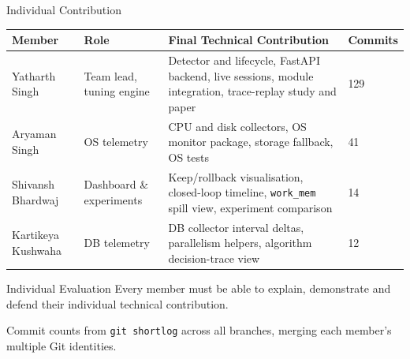 \documentclass[aspectratio=169,11pt]{beamer}
\newcommand{\smallnote}[1]{%
\vspace{0.08cm}
{\scriptsize\color{GEUGrey}#1}
}
\begin{document}
\begin{frame}{Individual Contribution}

\scriptsize

\begin{center}

\renewcommand{\arraystretch}{1.3}

\begin{tabularx}{.96\textwidth}
{@{}p{2.2cm}p{2.3cm}X p{1.2cm}@{}}

\toprule
Member &
Role &
Final Technical Contribution &
Commits\\
\midrule

Yatharth Singh &
Team lead, tuning engine &
Detector and lifecycle, FastAPI backend, live sessions, module integration,
trace-replay study and paper &
129\\

Aryaman Singh &
OS telemetry &
CPU and disk collectors, OS monitor package, storage fallback, OS tests &
41\\

Shivansh Bhardwaj &
Dashboard \& experiments &
Keep/rollback visualisation, closed-loop timeline, \texttt{work\_mem} spill view,
experiment comparison &
14\\

Kartikeya Kushwaha &
DB telemetry &
DB collector interval deltas, parallelism helpers, algorithm decision-trace view &
12\\

\bottomrule

\end{tabularx}

\end{center}

\vspace{2mm}

\begin{block}{Individual Evaluation}
Every member must be able to explain, demonstrate and defend
their individual technical contribution.
\end{block}

\smallnote{
Commit counts from \texttt{git shortlog} across all branches, merging each member's
multiple Git identities.
}

\end{frame}
\end{document}

